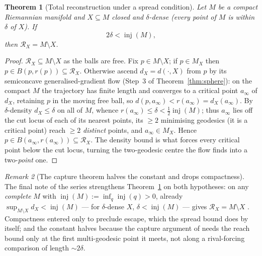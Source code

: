 \documentclass[11pt]{article}
\newtheorem{theorem}{Theorem}[section]
\theoremstyle{remark}
\newtheorem{remark}[theorem]{Remark}
\newcommand{\X}{X}
\newcommand{\Mx}{M_{\X}}
\newcommand{\Rx}{\mathcal{R}_{\X}}
\newcommand{\inj}{\operatorname{inj}}
\begin{document}
\begin{theorem}[Total reconstruction under a spread condition]
\label{thm:dense}
Let $M$ be a compact Riemannian manifold and $\X\subseteq M$ closed and
\emph{$\delta$-dense} (every point of $M$ is within $\delta$ of $\X$). If
\[
  2\delta<\inj(M),
\]
then $\Rx=M\setminus\X$.
\end{theorem}

\begin{proof}
$\Rx\subseteq M\setminus\X$ as the balls are free. Fix $p\in M\setminus\X$;
if $p\in\Mx$ then $p\in B(p,r(p))\subseteq\Rx$. Otherwise ascend
$d_{\X}=d(\cdot,\X)$ from $p$ by its semiconcave generalised-gradient flow
(Step~3 of Theorem~\ref{thm:sphere}): on the compact $M$ the trajectory has
finite length and converges to a critical point $a_{\infty}$ of $d_{\X}$,
retaining $p$ in the moving free ball, so $d(p,a_{\infty})<r(a_{\infty})=
d_{\X}(a_{\infty})$. By $\delta$-density $d_{\X}\le\delta$ on all of $M$,
whence $r(a_{\infty})\le\delta<\tfrac12\inj(M)$; thus $a_{\infty}$ lies off
the cut locus of each of its nearest points, its $\ge2$ minimising
geodesics (it is a critical point) reach $\ge2$ \emph{distinct} points, and
$a_{\infty}\in\Mx$. Hence $p\in B(a_{\infty},r(a_{\infty}))\subseteq\Rx$.
The density bound is what forces every critical point below the cut locus,
turning the two-geodesic centre the flow finds into a two-\emph{point} one.
\end{proof}

\begin{remark}[The capture theorem halves the constant and drops
compactness]\label{rem:densebetter}
The final note of the series strengthens Theorem~\ref{thm:dense} on
both hypotheses: on any \emph{complete} $M$ with
$\inj(M):=\inf_{q}\inj(q)>0$, already
$\sup_{M\setminus\X}d_{\X}<\inj(M)$ --- for $\delta$-dense $\X$,
$\delta<\inj(M)$ --- gives $\Rx=M\setminus\X$ \cite[Cor.~3.3]{C}.
Compactness entered only to preclude escape, which the spread bound
does by itself; and the constant halves because the capture argument
of \cite{C} needs the reach bound only at the first multi-geodesic
point it meets, not along a rival-forcing comparison of length
$\sim2\delta$.
\end{remark}
\end{document}
